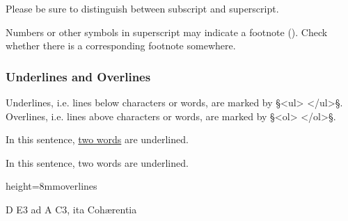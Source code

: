 \begin{note}
Please be sure to distinguish between subscript and superscript.
\end{note}

\begin{note}
Numbers or other symbols in superscript may indicate a footnote (). Check whether there is a corresponding footnote somewhere.
\end{note}

\subsubsection{Underlines and Overlines}
\label{section underlines and overlines}

\begin{mainrule}
Underlines, i.e. lines below characters or words, are marked by §<ul> </ul>§. 
Overlines, i.e. lines above characters or words, are marked by §<ol> </ol>§. 
\end{mainrule}


\vspace{3mm}
\begin{example}[ 1: \, underlines]

\vspace{-4mm}
In this sentence, \underline{two words} are underlined.

\vspace{-3mm}
\begin{typeLatin}
In this sentence, two words are underlined. \\
\end{typeLatin}
\end{example}

\begin{sampleImageSmall}[ 2: \, overlines]{height=8mm}{overlines}

\begin{typeLatin}
D E3\bold{</^>} ad A C3\bold{</^>}, ita Cohærentia \\
\end{typeLatin}
\end{sampleImageSmall}

